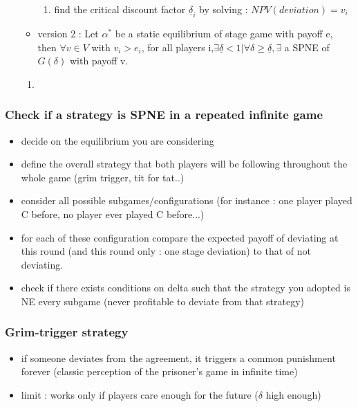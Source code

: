 \documentclass{article}
\begin{document}
\begin{itemize}
\begin{itemize}
\begin{Proof}
\begin{enumerate}
        \item find the critical discount factor $\underline{\delta}_i$ by solving : $NPV(deviation)=v_i$
    \end{enumerate}
\end{Proof}
        \item version 2 : Let $\alpha^*$ be a static equilibrium of stage game with payoff e, then $\forall v\in V$ with $v_i>e_i$, for all players i,$\exists \underline{\delta}<1|\forall \delta\geq\underline{\delta},\exists$ a SPNE of $G(\delta)$ with payoff v.
    \end{itemize}
    \begin{enumerate}
        \item
    \end{enumerate}
\end{itemize}

\subsubsection{Check if a strategy is SPNE in a repeated infinite game}
\begin{itemize}
    \item decide on the equilibrium you are considering
    \item define the overall strategy that both players will be following throughout the whole game (grim trigger, tit for tat..)
    \item consider all possible subgames/configurations (for instance : one player played C before, no player ever played C before...)
    \item for each of these configuration compare the expected payoff of deviating at this round (and this round only : one stage deviation) to that of not deviating. 
    \item check if there exists conditions on delta such that the strategy you adopted is NE every subgame (never profitable to deviate from that strategy)
\end{itemize}

\subsubsection{Grim-trigger strategy}
\begin{itemize}
    \item if someone deviates from the agreement, it triggers a common punishment forever (classic perception of the prisoner's game in infinite time)
    \item limit : works only if players care enough for the future ($\delta$ high enough)
\end{itemize}
\end{document}
